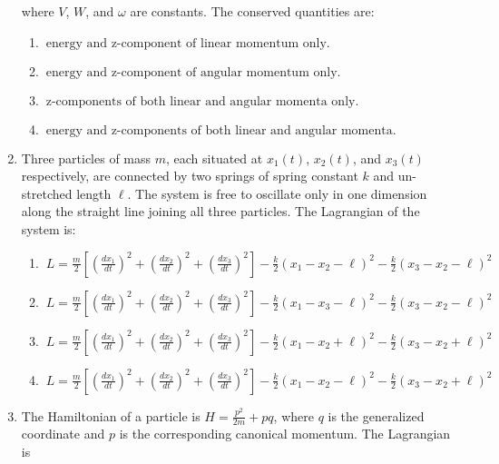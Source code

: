 \documentclass[journal]{IEEEtran}
\begin{document}
\begin{enumerate}
where \( V \), \( W \), and \( \omega \) are constants. The conserved quantities are:
\begin{enumerate}
\item $\ \text{energy and z-component of linear momentum only.}$
\item $ \ \text{energy and z-component of angular momentum only.} $
\item $\ \text{z-components of both linear and angular momenta only.} $
\item $\ \text{energy and z-components of both linear and angular momenta.}$
\end{enumerate} 
\item Three particles of mass \( m \), each situated at \( x_1(t) \), \( x_2(t) \), and \( x_3(t) \) respectively, are connected by two springs of spring constant \( k \) and un-stretched length \( \ell \). The system is free to oscillate only in one dimension along the straight line joining all three particles. The Lagrangian of the system is:
\begin{enumerate}
\item $ \ L = \frac{m}{2} \left[ \left( \frac{dx_1}{dt} \right)^2 + \left( \frac{dx_2}{dt} \right)^2 + \left( \frac{dx_3}{dt} \right)^2 \right] - \frac{k}{2} (x_1 - x_2 - \ell)^2 - \frac{k}{2} (x_3 - x_2 - \ell)^2$
\item $ \ L = \frac{m}{2} \left[ \left( \frac{dx_1}{dt} \right)^2 + \left( \frac{dx_2}{dt} \right)^2 + \left( \frac{dx_3}{dt} \right)^2 \right] - \frac{k}{2} (x_1 - x_3 - \ell)^2 - \frac{k}{2} (x_3 - x_2 - \ell)^2$
\item $ \ L = \frac{m}{2} \left[ \left( \frac{dx_1}{dt} \right)^2 + \left( \frac{dx_2}{dt} \right)^2 + \left( \frac{dx_3}{dt} \right)^2 \right] - \frac{k}{2} (x_1 - x_2 + \ell)^2 - \frac{k}{2} (x_3 - x_2 + \ell)^2$
\item $ \ L = \frac{m}{2} \left[ \left( \frac{dx_1}{dt} \right)^2 + \left( \frac{dx_2}{dt} \right)^2 + \left( \frac{dx_3}{dt} \right)^2 \right] - \frac{k}{2} (x_1 - x_2 - \ell)^2 - \frac{k}{2} (x_3 - x_2 + \ell)^2$
\end{enumerate}
\item The Hamiltonian of a particle is \( H = \frac{p^2}{2m} + pq \), where  $q$ is the generalized coordinate and  $p$  is the corresponding canonical momentum. The Lagrangian is


\end{enumerate}
\end{document}
